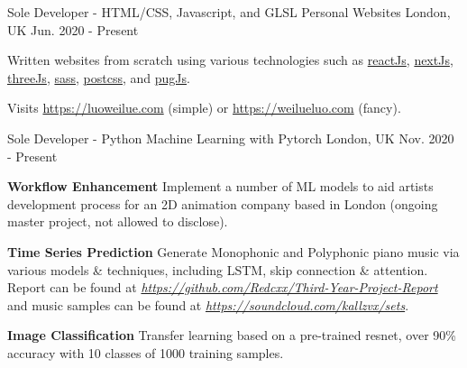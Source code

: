 

\begin{cventries}

  \cventry
    {Sole Developer - HTML/CSS, Javascript, and GLSL} %
    {Personal Websites} %
    {London, UK} %
    {Jun. 2020 - Present} %
    {
      \begin{cvitems} %
        \item {Written websites from scratch using various technologies such as \href{https://reactjs.org/}{reactJs}, \href{https://nextjs.org/}{nextJs}, \href{https://threejs.org/}{threeJs}, \href{https://sass-lang.com/}{sass},  \href{https://postcss.org/}{postcss}, and \href{https://pugjs.org/api/getting-started.html}{pugJs}.}
        \item Visits \url{https://luoweilue.com} (simple) or \url{https://weilueluo.com} (fancy).
      \end{cvitems}
    }
    
  \cventry
    {Sole Developer - Python} %
    {Machine Learning with Pytorch} %
    {London, UK} %
    {Nov. 2020 - Present} %
    {
      \begin{cvitems} %
      \item {\textbf{Workflow Enhancement} Implement a number of ML models to aid artists development process for an 2D animation company based in London (ongoing master project, not allowed to disclose).}
        \item {\textbf{Time Series Prediction} Generate Monophonic and Polyphonic piano music via various models \& techniques, including LSTM, skip connection \& attention. Report can be found at \href{https://github.com/Redcxx/Third-Year-Project-Report}{\textit{https://github.com/Redcxx/Third-Year-Project-Report}} and music samples can be found at \href{https://soundcloud.com/kallzvx/sets}{\textit{https://soundcloud.com/kallzvx/sets}}.}
        \item {\textbf{Image Classification} Transfer learning based on a pre-trained resnet, over 90\% accuracy with 10 classes of 1000 training samples.}
      \end{cvitems}
    }
    

\end{cventries}
